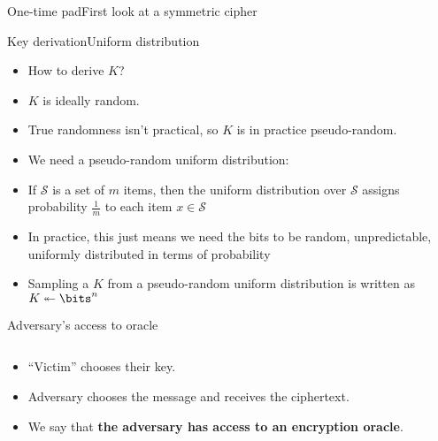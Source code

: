 \documentclass[aspectratio=169, lualatex, handout]{beamer}
\begin{document}
\begin{frame}{One-time pad}{First look at a symmetric cipher}
\end{frame}

\begin{frame}{Key derivation}{Uniform distribution}
	\begin{itemize}[<+->]
		\item How to derive $K$?
		\item $K$ is ideally random.
		\item True randomness isn't practical, so $K$ is in practice pseudo-random.
		\item We need a pseudo-random uniform distribution:
		\item If $\mathcal{S}$ is a set of $m$ items, then the uniform distribution over $\mathcal{S}$ assigns probability $\frac{1}{m}$ to each item $x \in \mathcal{S}$
		\item In practice, this just means we need the bits to be random, unpredictable, uniformly distributed in terms of probability
		\item Sampling a $K$ from a pseudo-random uniform distribution is written as $K \twoheadleftarrow \bits^n$
	\end{itemize}
\end{frame}

\begin{frame}{Adversary's access to oracle}
	\begin{columns}[c]
		\begin{column}{0.5\textwidth}
			\begin{itemize}[<+->]
				\item ``Victim'' chooses their key.
				\item Adversary chooses the message and receives the ciphertext.
				\item We say that \textbf{the adversary has access to an encryption oracle}.
			\end{itemize}
		\end{column}
		\begin{column}{0.5\textwidth}
		\end{column}
	\end{columns}
\end{frame}
\end{document}
